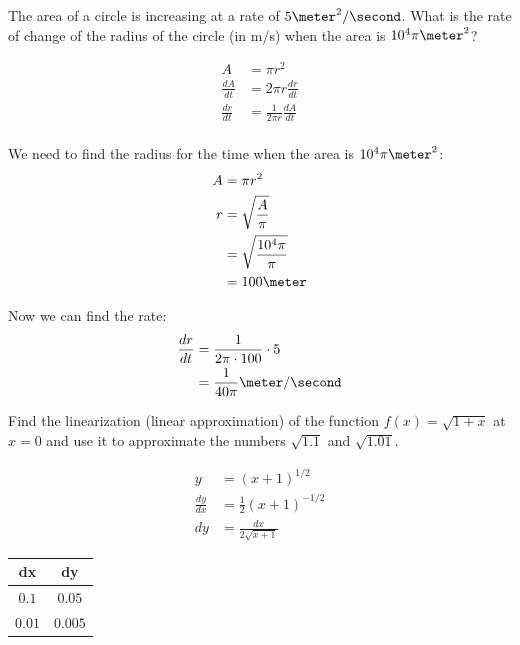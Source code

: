 \documentclass[fleqn,addpoints]{exam}
\begin{document}
\begin{questions}
\begin{solution}
\end{solution}

\question The area of a circle is increasing at a rate of $5 \meter^2/\second$. What is the rate of change of the radius of the
circle (in m/s) when the area is $10^4 \pi \meter^2$?

\begin{solution}
\begin{align*}
  A &= \pi r^2 \\
  \frac{dA}{dt} &= 2 \pi r \frac{dr}{dt} \\
  \frac{dr}{dt} &= \frac{1}{2 \pi r} \frac{dA}{dt} \\
\end{align*}

We need to find the radius for the time when the area is $10^4 \pi \meter^2$:
\begin{align*}
  A &= \pi r^2 \\
  r &= \sqrt{\frac{A}{\pi}} \\
    &= \sqrt{\frac{10^4 \pi}{\pi}} \\
    &= 100 \meter \\
\end{align*}

Now we can find the rate:
\begin{align*}
  \frac{dr}{dt} &= \frac{1}{2 \pi \cdot 100} \cdot 5 \\
  &= \frac{1}{40 \pi} \meter / \second \\
\end{align*}

\end{solution}
\question Find the linearization (linear approximation) of the function $f(x) = \sqrt{1 + x}$ at $x = 0$ and use
it to approximate the numbers $\sqrt{1.1}$ and $\sqrt{1.01}$.

\begin{solution}
\begin{align*}
  y &= (x + 1)^{1/2} \\
  \frac{dy}{dx} &= \frac{1}{2} (x + 1)^{-1/2} \\
  dy &= \frac{dx}{2 \sqrt{x + 1}}
\end{align*}

\begin{tabular}{cc}
\toprule
dx & dy \\
\midrule
$0.1$  & $0.05$ \\
$0.01$ & $0.005$ \\
\bottomrule
\end{tabular}


\end{solution}
\end{questions}
\end{document}
